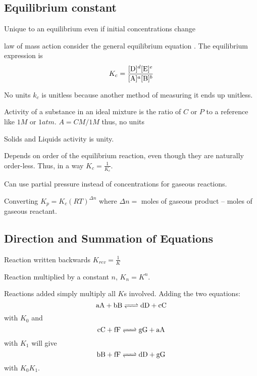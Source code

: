 \begin{mdframed}
\begin{multicols}{2}
\subsection{Equilibrium constant}
\begin{compactdesc}
    \item[Unique to an equilibrium] even if initial concentrations change
    \item[law of mass action] consider the general equilibrium
        equation . The equilibrium expression is
        \[
            K_c = \frac { [\ce{D}]^d [\ce{E}]^e} {[\ce{A}]^a [\ce{B}]^b }
        \]
    \item[No units] $k_c$ is unitless because another method of measuring it
        ends up unitless.
    \item[Activity] of a substance in an ideal mixture is the ratio of $C$ or
        $P$ to a reference like $1M$ or $1atm$. $A = C M / 1 M$ thus, no units
    \item[Solids and Liquids] activity is unity.
    \item[Depends on order] of the equilibrium reaction, even though they
        are naturally order-less. Thus, in a way $K_c = \frac{1}{K_c}$.
    \item[Can use partial pressure] instead of concentrations for gaseous
        reactions.
    \item[Converting] $K_p = K_c (RT)^{\Delta n}$ where $\Delta n = $ moles
        of gaseous product -- moles of gaseous reactant.
\end{compactdesc}
\end{multicols}
\end{mdframed}


\begin{mdframed}
\begin{multicols}{2}
\subsection{Direction and Summation of Equations}
\begin{compactdesc}
    \item[Reaction written backwards] $K_{rev} = \frac{1}{K}$
    \item[Reaction multiplied] by a constant $n$, $K_{n} = K^n$.
    \item[Reactions added] simply multiply all $K$s involved.
        Adding the two equations:
        \[ \ce{aA + bB <=> dD + cC} \] with $K_0$ and
        \[ \ce{cC + fF <=> gG + aA} \] with $K_1$ will give
        \[ \ce{bB + fF <=> dD + gG} \] with $K_0 K_1$.
\end{compactdesc}
\end{multicols}
\end{mdframed}


